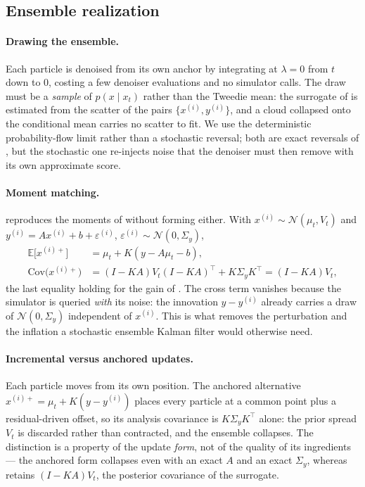 \subsection{Ensemble realization} \label{appendice:ensemble}

\paragraph{Drawing the ensemble.} \label{appendice:draw}
Each particle is denoised from its own anchor by integrating  at
$\lambda = 0$ from $t$ down to $0$, costing a few denoiser evaluations and no simulator calls.
The draw must be a \emph{sample} of $p(x \mid x_t)$ rather than the Tweedie mean: the surrogate
of  is estimated from the scatter of the pairs $\{x^{(i)}, y^{(i)}\}$, and a cloud
collapsed onto the conditional mean carries no scatter to fit. We use the deterministic
probability-flow limit rather than a stochastic reversal; both are exact reversals of
, but the stochastic one re-injects noise that the denoiser
must then remove with its own approximate score.

\paragraph{Moment matching.} \label{appendice:moment_matching}
 reproduces the moments of  without forming either.
With $x^{(i)} \sim \mathcal{N}(\mu_t, V_t)$ and
$y^{(i)} = Ax^{(i)} + b + \varepsilon^{(i)}$, $\varepsilon^{(i)} \sim \mathcal{N}(0, \Sigma_y)$,
\begin{align} \label{eq:update_moments}
    \mathbb{E}\bigl[x^{(i)+}\bigr] &= \mu_t + K(y - A\mu_t - b), \\
    \mathrm{Cov}\bigl(x^{(i)+}\bigr)
      &= (I - KA)V_t(I - KA)^{\top} + K\Sigma_y K^{\top} = (I - KA)V_t ,
\end{align}
the last equality holding for the gain of . The cross term vanishes because the
simulator is queried \emph{with} its noise: the innovation $y - y^{(i)}$ already carries a draw
of $\mathcal{N}(0,\Sigma_y)$ independent of $x^{(i)}$. This is what removes the perturbation and
the inflation a stochastic ensemble Kalman filter would otherwise need.

\paragraph{Incremental versus anchored updates.} \label{appendice:anchoring}
Each particle moves from its own position. The anchored alternative
$x^{(i)+} = \mu_t + K(y - y^{(i)})$ places every particle at a common point plus a
residual-driven offset, so its analysis covariance is $K\Sigma_yK^{\top}$ alone: the prior
spread $V_t$ is discarded rather than contracted, and the ensemble collapses. The distinction is
a property of the update \emph{form}, not of the quality of its ingredients --- the anchored form
collapses even with an exact $A$ and an exact $\Sigma_y$, whereas 
retains $(I - KA)V_t$, the posterior covariance of the surrogate.

